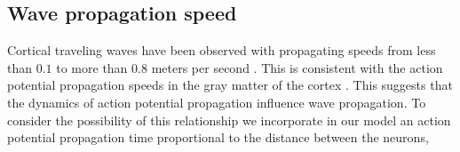 \documentclass[12pt]{article}
\begin{document}
\subsection{Wave propagation speed} \label{sub:propagation_speed}
Cortical traveling waves have been observed with propagating speeds from \color{red}less than $0.1$ to more than $0.8$ meters per second \parencite{Sato2012}\parencite{Golomb1997}\parencite{Chervin1988}\color{black}.
\color{red}
This is consistent with the action potential propagation speeds in the gray matter of the cortex \parencite{Muller2018}. 
This suggests that the dynamics of action potential propagation influence wave propagation. 
To consider the possibility of this relationship we incorporate in our model an action potential propagation time proportional to the distance between the neurons,
\color{black}
\end{document}
